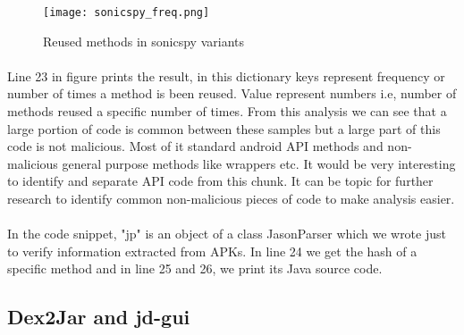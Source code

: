 \documentclass[../main.tex]{subfile}
\begin{document}
		\begin{figure}
			\texttt{[image: sonicspy\_freq.png]}
			\caption{Reused methods in sonicspy variants}
			\label{fig:sonicspy_freq}
		\end{figure}
		\paragraph{} Line 23 in figure prints the result, in this dictionary keys represent frequency or number of times a method is been reused. Value represent numbers i.e, number of methods reused a specific number of times. From this analysis we can see that a large portion of code is common between these samples but a large part of this code is not malicious. Most of it standard android API methods and non-malicious general purpose methods like wrappers etc. It would be very interesting to identify and separate API code from this chunk. It can be topic for further research to identify common non-malicious pieces of code to make analysis easier.
		
		\paragraph{} In the code snippet, "jp" is an object of a class JasonParser which we wrote just to verify information extracted from APKs. In line 24 we get the hash of a specific method and in line 25 and 26, we print its Java source code. 		


		\subsection{Dex2Jar and jd-gui}
		
\end{document}
